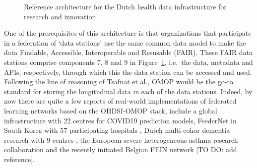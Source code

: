 \documentclass[
  authoryear]{elsarticle}
\begin{document}
\begin{figure}


\caption{\label{fig-healthri-architecture}Reference architecture for the
Dutch health data infrastructure for research and innovation
\citep{healthri2024agreements}}

\end{figure}%

One of the prerequisites of this architecture is that organizations that
participate in a federation of `data stations' use the same common data
model to make the data Findable, Accessible, Interoperable and Resusable
(FAIR). These FAIR data stations comprise components 7, 8 and 9 in
Figure~\ref{fig-healthri-architecture}, i.e.~the data, metadata and
APIs, respectively, through which this the data station can be accessed
and used. Following the line of reasoning of Tsafnat et al., OMOP would
be the go-to standard for storing the longitudinal data in each of the
data stations. Indeed, by now there are quite a few reports of
real-world implementations of federated learning networks based on the
OHDSI-OMOP stack, include a global infrastructure with 22 centres for
COVID19 prediction models\citep{khalid2021standardized}, FeederNet in
South Korea with 57 participating hospitals \citep{lee2022feedernet},
Dutch multi-cohor dementia research with 9 centres
\citep{mateus2024data}, the European severe heterogeneous asthma
research collaboration \citep{kroes2022blueprint} and the recently
initiated Belgian FEIN network {[}TO DO: add reference{]}.
\end{document}
